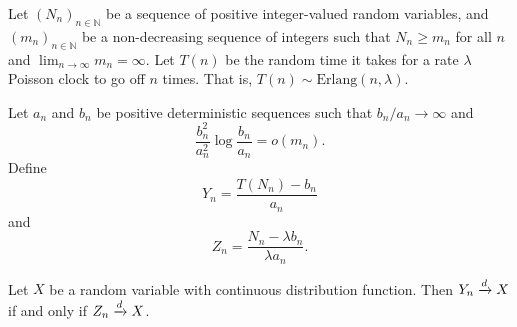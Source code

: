 	\begin{proposition}
	\label{claim:discrete vs continuous distributions}
		Let $(N_n)_{n \in \mathbb{N}}$ be a sequence of positive integer-valued random variables, and $(m_n)_{n \in \mathbb{N}}$ be a non-decreasing sequence of integers such that $N_n \geq m_n$ for all $n$ and $\lim_{n \rightarrow \infty} m_n = \infty$. Let $T(n)$ be the random time it takes for a rate $\lambda$ Poisson clock to go off $n$ times. That is, $T(n) \sim \mathrm{Erlang}(n, \lambda)$.

		Let $a_n$ and $b_n$ be positive deterministic sequences such that $b_n / a_n \rightarrow \infty$ and
		\begin{equation}
			\frac{b_n^2}{a_n^2}\log\frac{b_n}{a_n} = o(m_n).
			\label{eq:m_n a_n b_n constraint}
		\end{equation}
		Define
		\begin{equation}
			Y_n = \frac{T(N_n) - b_n}{a_n}
		\end{equation}
		and 
		\begin{equation}
			Z_n = \frac{N_n - \lambda b_n}{\lambda a_n}.
		\end{equation}

		Let $X$ be a random variable with continuous distribution function. Then $Y_n \xrightarrow{d} X$ if and only if $Z_n \xrightarrow{d} X$.


	\end{proposition}

